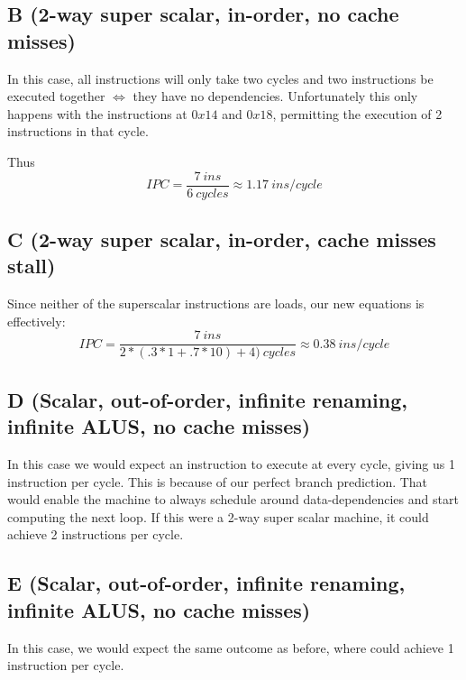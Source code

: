 \documentclass{article}
\begin{document}
\subsection{B (2-way super scalar, in-order, no cache misses)}
In this case, all instructions will only take two cycles and two instructions be executed together $\iff$ they have no dependencies.  Unfortunately this only happens with the instructions at $0x14$ and $0x18$, permitting the execution of 2 instructions in that cycle.

Thus
\begin{equation*}
IPC = \frac{7~ins}{6~cycles} \approx 1.17~ins/cycle
\end{equation*}

\subsection{C (2-way super scalar, in-order, cache misses stall)}
Since neither of the superscalar instructions are loads, our new equations is effectively:
\begin{equation*}
IPC = \frac{7~ins}{2*(.3*1+.7*10) +4)~cycles} \approx 0.38~ins/cycle
\end{equation*}

\subsection{D (Scalar, out-of-order, infinite renaming, infinite ALUS, no cache misses)}
In this case we would expect an instruction to execute at every cycle, giving us 1 instruction per cycle.  This is because of our perfect branch prediction.  That would enable the machine to always schedule around data-dependencies and start computing the next loop.  If this were a 2-way super scalar machine, it could achieve 2 instructions per cycle.

\subsection{E (Scalar, out-of-order, infinite renaming, infinite ALUS, no cache misses)}
In this case, we would expect the same outcome as before, where could achieve 1 instruction per cycle.

\newpage
\end{document}
